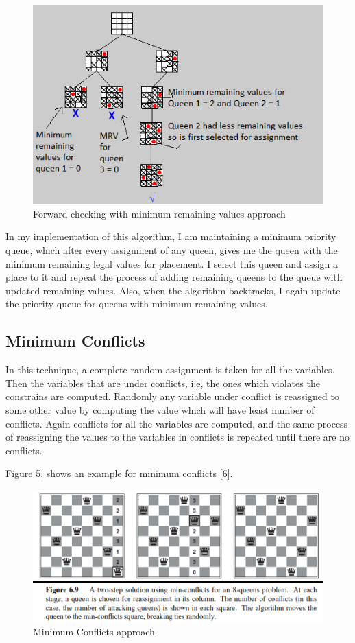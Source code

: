 \documentclass[conference]{IEEEtran}
\begin{document}
\begin{figure}
\includegraphics[scale=0.65]{ForwardCheckingWithMRV.png}
\caption{Forward checking with minimum remaining values approach}
\label{Figure4}
\end{figure}


In my implementation of this algorithm, I am maintaining a minimum priority queue, which after every  assignment of any queen, gives me the queen with the minimum remaining legal values for placement. I select this queen and assign a place to it and repeat the process of adding remaining queens to the queue with updated remaining values. Also, when the algorithm backtracks, I again update the priority queue for queens with minimum remaining values.

\subsection{Minimum Conflicts}

In this technique, a complete random assignment is taken for all the variables. Then the variables that are under conflicts, i.e, the ones which violates the constrains are computed. Randomly any variable under conflict is reassigned to some other value by computing the value which will have least number of conflicts. Again conflicts for all the variables are computed, and the same process of reassigning the values to the variables in conflicts is repeated until there are no conflicts.

Figure 5, shows an example for minimum conflicts [6]. 
\begin{figure}
\includegraphics[scale=0.65]{MinimumConflicts.png}
\caption{Minimum Conflicts approach}
\label{Figure5}
\end{figure}
\end{document}
